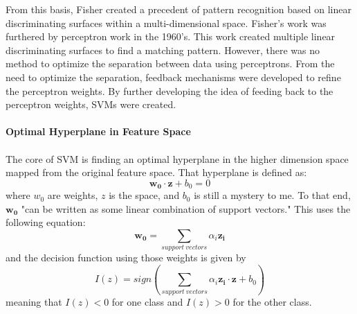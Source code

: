 

			From this basis, Fisher created a precedent of pattern recognition based on linear discriminating surfaces within a multi-dimensional space.  Fisher's work was furthered by perceptron work in the 1960's.  This work created multiple linear discriminating surfaces to find a matching pattern.  However, there was no method to optimize the separation between data using perceptrons.  From the need to optimize the separation, feedback mechanisms were developed to refine the perceptron weights. By further developing the idea of feeding back to the perceptron weights, SVMs were created.



			\paragraph{Optimal Hyperplane in Feature Space}
			\paragraph{} The core of SVM is finding an optimal hyperplane in the higher dimension space mapped from the original feature space.  That hyperplane is defined as:
			\begin{equation}\label{eq:oh1} \mathbf{w_0} \cdot \mathbf{z} + b_0 = 0\end{equation} where $w_0$ are weights, $z$ is the space, and $b_0$ is still a mystery to me.
			To that end, $\mathbf{w_0}$ "can be written as some linear combination of support vectors."  This uses the following equation:
			\begin{equation}\mathbf{w_0} = \sum_{support\ vectors} \alpha_i \mathbf{z_i}\end{equation} and the decision function using those weights is given by
			\begin{equation}I(z) = sign\left(\sum_{support\ vectors} \alpha_i \mathbf{z_i} \cdot \mathbf{z} + b_0\right)\end{equation}
			meaning that $I(z) < 0$ for one class and $I(z) > 0$ for the other class.
